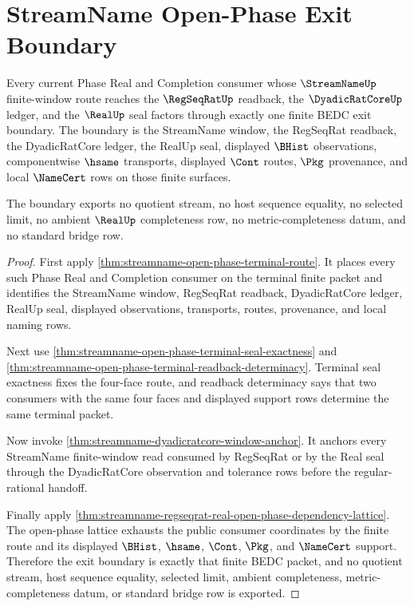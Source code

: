 \section{StreamName Open-Phase Exit Boundary}
\label{sec:streamname-open-phase-exit-boundary}

\begin{theorem}
\label{thm:streamname-open-phase-exit-boundary}
Every current Phase Real and Completion consumer whose $\StreamNameUp$ finite-window route reaches the $\RegSeqRatUp$ readback, the $\DyadicRatCoreUp$ ledger, and the $\RealUp$ seal factors through exactly one finite BEDC exit boundary. The boundary is the StreamName window, the RegSeqRat readback, the DyadicRatCore ledger, the RealUp seal, displayed $\BHist$ observations, componentwise $\hsame$ transports, displayed $\Cont$ routes, $\Pkg$ provenance, and local $\NameCert$ rows on those finite surfaces.

The boundary exports no quotient stream, no host sequence equality, no selected limit, no ambient $\RealUp$ completeness row, no metric-completeness datum, and no standard bridge row.
\end{theorem}
\begin{proof}
First apply \autoref{thm:streamname-open-phase-terminal-route}. It places every such Phase Real and Completion consumer on the terminal finite packet and identifies the StreamName window, RegSeqRat readback, DyadicRatCore ledger, RealUp seal, displayed observations, transports, routes, provenance, and local naming rows.

Next use \autoref{thm:streamname-open-phase-terminal-seal-exactness} and \autoref{thm:streamname-open-phase-terminal-readback-determinacy}. Terminal seal exactness fixes the four-face route, and readback determinacy says that two consumers with the same four faces and displayed support rows determine the same terminal packet.

Now invoke \autoref{thm:streamname-dyadicratcore-window-anchor}. It anchors every StreamName finite-window read consumed by RegSeqRat or by the Real seal through the DyadicRatCore observation and tolerance rows before the regular-rational handoff.

Finally apply \autoref{thm:streamname-regseqrat-real-open-phase-dependency-lattice}. The open-phase lattice exhausts the public consumer coordinates by the finite route and its displayed $\BHist$, $\hsame$, $\Cont$, $\Pkg$, and $\NameCert$ support. Therefore the exit boundary is exactly that finite BEDC packet, and no quotient stream, host sequence equality, selected limit, ambient completeness, metric-completeness datum, or standard bridge row is exported.
\end{proof}


